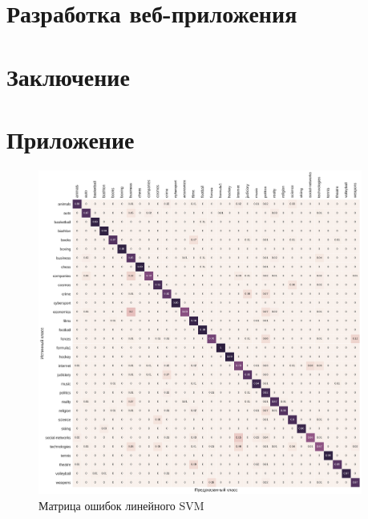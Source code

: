 \documentclass[a4paper, 14pt]{extarticle}
\begin{document}
\section{Разработка веб-приложения}


\section{Заключение}


\setcounter{secnumdepth}{0}
\section{Приложение}
\begin{figure}[h!]
	\centering
	\includegraphics[width=0.95\textwidth]{svm_confusion_matrix.pdf}
	\caption{Матрица ошибок линейного SVM}
	\label{svm_confusion}
\end{figure}
\end{document}

